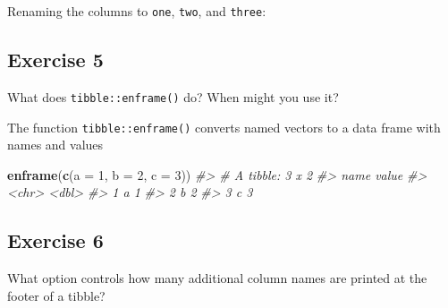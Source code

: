 \documentclass[]{book}
\newenvironment{Shaded}{\begin{snugshade}}{\end{snugshade}}
\newcommand{\CommentTok}[1]{\textcolor[rgb]{0.56,0.35,0.01}{\textit{#1}}}
\newcommand{\DataTypeTok}[1]{\textcolor[rgb]{0.13,0.29,0.53}{#1}}
\newcommand{\DecValTok}[1]{\textcolor[rgb]{0.00,0.00,0.81}{#1}}
\newcommand{\KeywordTok}[1]{\textcolor[rgb]{0.13,0.29,0.53}{\textbf{#1}}}
\newcommand{\NormalTok}[1]{#1}
\newcommand{\StringTok}[1]{\textcolor[rgb]{0.31,0.60,0.02}{#1}}
\theoremstyle{plain}
\theoremstyle{remark}
\theoremstyle{definition}
\theoremstyle{definition}
\theoremstyle{definition}
\theoremstyle{remark}
\begin{document}
Renaming the columns to \texttt{one}, \texttt{two}, and \texttt{three}:

\begin{Shaded}
\end{Shaded}

\hypertarget{exercise-5-8}{%
\subsection{Exercise 5}\label{exercise-5-8}}

What does \texttt{tibble::enframe()} do? When might you use it?

The function \texttt{tibble::enframe()} converts named vectors to a data
frame with names and values

\begin{Shaded}
\begin{Highlighting}[]
\KeywordTok{enframe}\NormalTok{(}\KeywordTok{c}\NormalTok{(}\DataTypeTok{a =} \DecValTok{1}\NormalTok{, }\DataTypeTok{b =} \DecValTok{2}\NormalTok{, }\DataTypeTok{c =} \DecValTok{3}\NormalTok{))}
\CommentTok{#> # A tibble: 3 x 2}
\CommentTok{#>   name  value}
\CommentTok{#>   <chr> <dbl>}
\CommentTok{#> 1 a         1}
\CommentTok{#> 2 b         2}
\CommentTok{#> 3 c         3}
\end{Highlighting}
\end{Shaded}

\hypertarget{exercise-6-6}{%
\subsection{Exercise 6}\label{exercise-6-6}}

What option controls how many additional column names are printed at the
footer of a tibble?
\end{document}
